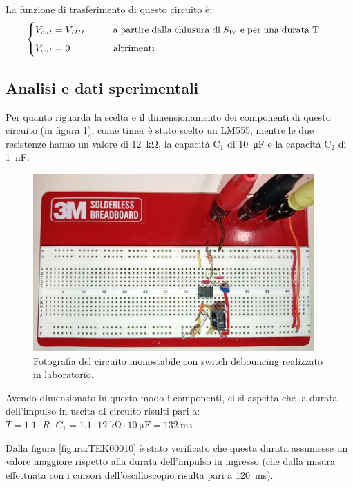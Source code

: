 \documentclass{report}
\begin{document}
La funzione di trasferimento di questo circuito è:
\begin{equation}
	\begin{cases}
		V_{out}= V_{DD}\indent\indent \mathrm{a\;partire\;dalla\;chiusura\;di\;} S_W \mathrm{\;e\;per\;una\;durata\;T\;}\\[5pt]
		V_{out}= 0\indent\indent\indent \mathrm{altrimenti}\\
	\end{cases}
\end{equation}

\subsection{Analisi e dati sperimentali}
Per quanto riguarda la scelta e il dimensionamento dei componenti di questo circuito (in figura \ref{figura:circuito1}), come timer è stato scelto un LM555, mentre le due resistenze hanno un valore di \SI{12}{\kilo\ohm}, la capacità $\mathrm{C_1}$ di \SI{10}{\micro\farad} e la capacità $\mathrm{C_2}$ di \SI{1}{\nano\farad}.

\begin{figure}[h!]
	\centering
	\includegraphics[height=6.8cm]{immagini/circuito1}
	\caption{Fotografia del circuito monostabile con switch debouncing realizzato in laboratorio.}
	\label{figura:circuito1}
\end{figure}

\noindent Avendo dimensionato in questo modo i componenti, ci si aspetta che la durata dell'impulso in uscita al circuito risulti pari a: 
\\\indent$\displaystyle{T = 1.1 \cdot R \cdot C_1 = 1.1 \cdot \SI{12}{\kilo\ohm} \cdot \SI{10}{\micro\farad} = \SI{132}{\milli\second}}$

\noindent Dalla figura \ref{figura:TEK00010} è stato verificato che questa durata assumesse un valore maggiore rispetto alla durata dell'impulso in ingresso (che dalla misura effettuata con i cursori dell'oscilloscopio risulta pari a \SI{120}{\milli\second}).
\end{document}
